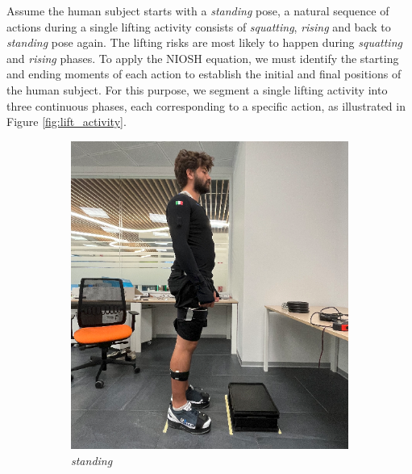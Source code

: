 Assume the human subject starts with a \emph{standing} pose, a natural sequence of actions during a single lifting activity consists of \emph{squatting}, \emph{rising} and back to \emph{standing} pose again. The lifting risks are most likely to happen during \emph{squatting} and \emph{rising} phases. To apply the NIOSH equation, we must identify the starting and ending moments of each action to establish the initial and final positions of the human subject. For this purpose, we segment a single lifting activity into three continuous phases, each corresponding to a specific action, as illustrated in Figure \ref{fig:lift_activity}.
\begin{figure}[htp]
     \centering
     \begin{subfigure}[b]{0.15\textwidth}
         \centering
         \includegraphics[width=\textwidth]{figures/gianmar_standing.png}
         \caption{\emph{standing}}
         \label{fig:lift_standing}
     \end{subfigure}
     \hfill
     \begin{subfigure}[b]{0.15\textwidth}
         \centering

\end{subfigure}
\end{figure}
